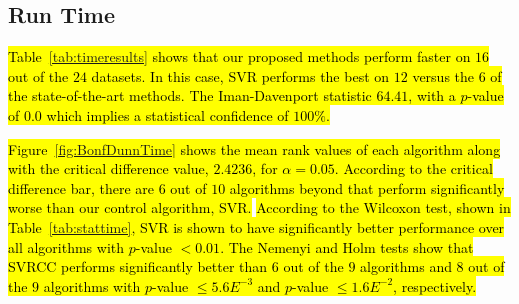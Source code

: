 \documentclass[preprint,12pt]{elsarticle}
\begin{document}
\newpage
\subsection{Run Time}\label{subsec:time}
\hl{Table~{\ref{tab:timeresults}} shows that our proposed methods perform faster on $16$ out of the $24$ datasets. In this case, SVR performs the best on $12$ versus the $6$ of the state-of-the-art methods. The Iman-Davenport statistic $64.41$, with a $p$-value of $0.0$ which implies a statistical confidence of $100\%$.}

\hl{Figure~{\ref{fig:BonfDunnTime}} shows the mean rank values of each algorithm along with the critical difference value, $2.4236$, for $\alpha = 0.05$. According to the critical difference bar, there are $6$ out of $10$ algorithms beyond that perform significantly worse than our control algorithm, SVR.}
\hl{According to the Wilcoxon test, shown in Table~{\ref{tab:stattime}}, SVR is shown to have significantly better performance over all algorithms with $p$-value $< 0.01$. The Nemenyi and Holm tests show that SVRCC performs significantly better than $6$ out of the $9$ algorithms and $8$ out of the $9$ algorithms with $p$-value $\leq 5.6E^{-3}$ and $p$-value $\leq 1.6E^{-2}$, respectively.}
\end{document}
